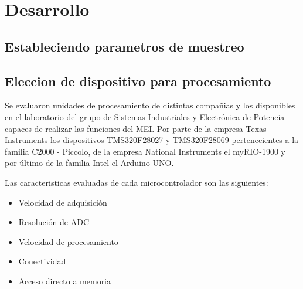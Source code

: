 \chapter{Desarrollo}\label{sec:capitulo3}
\thispagestyle{empty}

\begingroup
{}
\small

\endgroup

\section{Estableciendo parametros de muestreo}

\section{Eleccion de dispositivo para procesamiento}
\par Se evaluaron unidades de procesamiento de distintas compañias y los
disponibles en el laboratorio del grupo de Sistemas Industriales y Electrónica
de Potencia capaces de realizar las funciones del MEI. Por parte de la empresa
Texas Instruments los dispositivos TMS320F28027 y TMS320F28069 pertenecientes
a la familia C2000 - Piccolo, de la empresa National Instruments el myRIO-1900
y por último de la familia Intel el Arduino UNO.

Las caracteristicas evaluadas de cada microcontrolador son las siguientes:
\begin{itemize}
  \item Velocidad de adquisición
  \item Resolución de ADC
  \item Velocidad de procesamiento
  \item Conectividad
  \item Acceso directo a memoria
\end{itemize}

